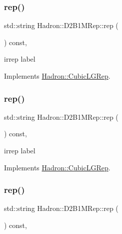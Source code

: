 \subsubsection{\texorpdfstring{rep()}{rep()}\hspace{0.1cm}{\footnotesize\ttfamily [1/3]}}
{\footnotesize\ttfamily std\+::string Hadron\+::\+D2\+B1\+M\+Rep\+::rep (\begin{DoxyParamCaption}{ }\end{DoxyParamCaption}) const\hspace{0.3cm}{\ttfamily [inline]}, {\ttfamily [virtual]}}

irrep label 

Implements \mbox{\hyperlink{structHadron_1_1CubicLGRep_a50f5ddbb8f4be4cee0106fa9e8c75e6c}{Hadron\+::\+Cubic\+L\+G\+Rep}}.

\mbox{\label{structHadron_1_1D2B1MRep_acdc6dd62590a2ab336e6f7669c63ed3f}} 
\subsubsection{\texorpdfstring{rep()}{rep()}\hspace{0.1cm}{\footnotesize\ttfamily [2/3]}}
{\footnotesize\ttfamily std\+::string Hadron\+::\+D2\+B1\+M\+Rep\+::rep (\begin{DoxyParamCaption}{ }\end{DoxyParamCaption}) const\hspace{0.3cm}{\ttfamily [inline]}, {\ttfamily [virtual]}}

irrep label 

Implements \mbox{\hyperlink{structHadron_1_1CubicLGRep_a50f5ddbb8f4be4cee0106fa9e8c75e6c}{Hadron\+::\+Cubic\+L\+G\+Rep}}.

\mbox{\label{structHadron_1_1D2B1MRep_acdc6dd62590a2ab336e6f7669c63ed3f}} 
\subsubsection{\texorpdfstring{rep()}{rep()}\hspace{0.1cm}{\footnotesize\ttfamily [3/3]}}
{\footnotesize\ttfamily std\+::string Hadron\+::\+D2\+B1\+M\+Rep\+::rep (\begin{DoxyParamCaption}{ }\end{DoxyParamCaption}) const\hspace{0.3cm}{\ttfamily [inline]}, {\ttfamily [virtual]}}

